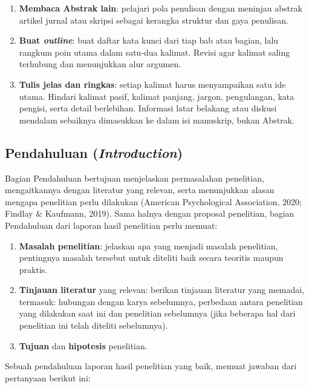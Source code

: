 \documentclass[
  indonesian,
  letterpaper,
  DIV=11,
  numbers=noendperiod]{scrreprt}
\providecommand{\tightlist}{%
  \setlength{\itemsep}{0pt}\setlength{\parskip}{0pt}}
\begin{document}
\begin{enumerate}
\def\labelenumi{\arabic{enumi}.}
\item
  \textbf{Membaca Abstrak lain}: pelajari pola penulisan dengan meninjau
  abstrak artikel jurnal atau skripsi sebagai kerangka struktur dan gaya
  penulisan.
\item
  \textbf{Buat \emph{outline}}: buat daftar kata kunci dari tiap bab
  atau bagian, lalu rangkum poin utama dalam satu‑dua kalimat. Revisi
  agar kalimat saling terhubung dan menunjukkan alur argumen.
\item
  \textbf{Tulis jelas dan ringkas}: setiap kalimat harus menyampaikan
  satu ide utama. Hindari kalimat pasif, kalimat panjang, jargon,
  pengulangan, kata pengisi, serta detail berlebihan. Informasi latar
  belakang atau diskusi mendalam sebaiknya dimasukkan ke dalam isi
  manuskrip, bukan Abstrak.
\end{enumerate}

\subsection{\texorpdfstring{Pendahuluan
(\emph{Introduction})}{Pendahuluan (Introduction)}}\label{pendahuluan-introduction}

Bagian Pendahuluan bertujuan menjelaskan permasalahan penelitian,
mengaitkannya dengan literatur yang relevan, serta menunjukkan alasan
mengapa penelitian perlu dilakukan (American Psychological Association,
2020; Findlay \& Kaufmann, 2019). Sama halnya dengan proposal
penelitian, bagian Pendahuluan dari laporan hasil penelitian perlu
memuat:

\begin{enumerate}
\def\labelenumi{\arabic{enumi}.}
\tightlist
\item
  \textbf{Masalah penelitian}: jelaskan apa yang menjadi masalah
  penelitian, pentingnya masalah tersebut untuk diteliti baik secara
  teoritis maupun praktis.
\item
  \textbf{Tinjauan literatur} yang relevan: berikan tinjauan literatur
  yang memadai, termasuk: hubungan dengan karya sebelumnya, perbedaan
  antara penelitian yang dilakukan saat ini dan penelitian sebelumnya
  (jika beberapa hal dari penelitian ini telah diteliti sebelumnya).
\item
  \textbf{Tujuan} dan \textbf{hipotesis} penelitian.
\end{enumerate}

Sebuah pendahuluan laporan hasil penelitian yang baik, memuat jawaban
dari pertanyaan berikut ini:
\end{document}
